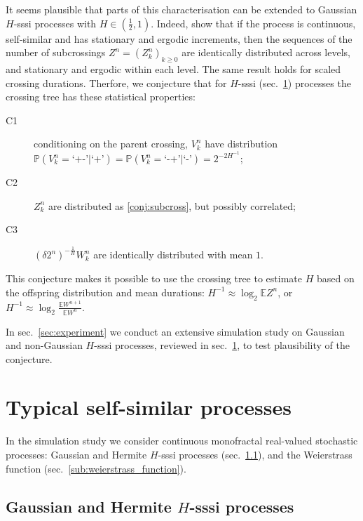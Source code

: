 \documentclass[a4paper]{article}
\newcommand{\pr}{\mathbb{P}}
\newcommand{\ex}{\mathbb{E}}
\begin{document}
It seems plausible that parts of this characterisation can be extended to Gaussian
$H$-sssi processes with $H \in(\frac{1}{2}, 1)$. Indeed, \cite{jonesshen2005} show
that if the process is continuous, self-similar and has stationary and ergodic increments,
then the sequences of the number of subcrossings $Z^n = (Z_k^n)_{k\geq 0}$ are identically
distributed across levels, and stationary and ergodic within each level. The same
result holds for scaled crossing durations. Therfore, we conjecture that for $H$-sssi
(sec.~\ref{sec:self_sim_processes}) processes the crossing tree has these statistical
properties:
\begin{description}
    \item[C1] conditioning on the parent crossing, $V_k^n$ have distribution
    $\pr(V_k^n = \text{`+-'}|\text{`+'}) = \pr(V_k^n = \text{`-+'}|\text{`-'}) = 2^{-2 H^{-1}}$;
    \item[C2] $Z_k^n$ are distributed as \eqref{conj:subcross}, but possibly correlated;
    \item[C3] $(\delta 2^n)^{-\frac{1}{H}} W_k^n$ are identically distributed with mean $1$.
\end{description}
This conjecture makes it possible to use the crossing tree to estimate $H$ based
on the offspring distribution and mean durations: $H^{-1} \approx \log_2 \ex Z^n$,
or $H^{-1} \approx \log_2 \frac{\ex W^{n+1}}{\ex W^n}$. 

In sec.~\ref{sec:experiment} we conduct an extensive simulation study on Gaussian
and non-Gaussian $H$-sssi processes, reviewed in sec.~\ref{sec:self_sim_processes},
to test plausibility of the conjecture.


\section{Typical self-similar processes} %
\label{sec:self_sim_processes}

In the simulation study we consider continuous monofractal real-valued stochastic
processes: Gaussian and Hermite $H$-sssi processes (sec.~\ref{sub:h_sssi_proc}),
and the Weierstrass function (sec.~\ref{sub:weierstrass_function}).

\subsection{Gaussian and Hermite $H$-sssi processes} %
\label{sub:h_sssi_proc}
\end{document}

